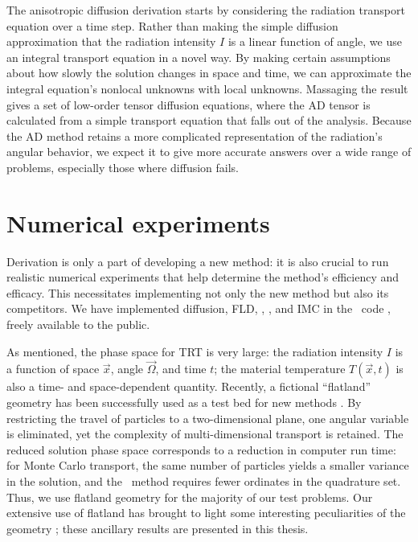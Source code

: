 The anisotropic diffusion derivation starts by considering the radiation
transport equation over a time step. Rather than
making the simple diffusion approximation that the radiation intensity $I$ is a
linear function of angle, we use an integral transport equation in a novel way.
By making certain assumptions about how slowly the solution changes in space
and time, we can approximate the integral equation's nonlocal unknowns
with local unknowns. Massaging the result gives a set of low-order tensor
diffusion equations, where the AD tensor is calculated from a simple transport
equation that falls out of the analysis. Because the AD method retains a more
complicated representation of the radiation's angular behavior, we expect it
to give more accurate answers over a wide range of problems, especially those
where diffusion fails.


\section{Numerical experiments}

Derivation is only a part of developing a new method: it is also
crucial to run realistic numerical experiments that help determine the method's
efficiency and efficacy. This necessitates implementing not only the new method
but also its competitors. We have implemented
diffusion, FLD, \Pone, \SN, and IMC in the \pytrt\ code \cite{Pytrt}, freely
available to the public.

As mentioned, the phase space for TRT is very large: the radiation intensity
$I$ is a function of space $\vec{x}$, angle $\vec{\Omega}$, and time $t$;
the material temperature $T(\vec{x},t)$ is also a time- and space-dependent
quantity. Recently, a fictional ``flatland'' geometry has been successfully
used as a test
bed for new methods \cite{Lar2009c,Joh2011,Tra2011}. By restricting the travel
of particles to a two-dimensional plane, one angular variable is eliminated,
yet the complexity of multi-dimensional transport is retained. The
reduced solution phase space corresponds to a reduction in computer run time:
for Monte Carlo transport, the same number of particles yields a smaller
variance in the solution, and the \SN\ method requires fewer ordinates in the
quadrature set. Thus, we use flatland geometry for the majority of our test
problems.
Our extensive use of flatland has brought to light some
interesting peculiarities of the geometry \cite{Joh2011a}; these ancillary
results are presented in this thesis.

